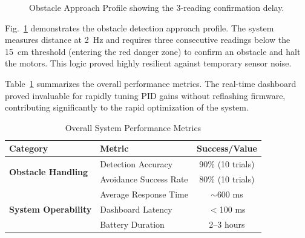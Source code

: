 \documentclass[conference]{IEEEtran}
\begin{document}
\begin{figure}[ht]
\centering
{}
\caption{Obstacle Approach Profile showing the 3-reading confirmation delay.}
\label{fig:obstacle}
\end{figure}

Fig.~\ref{fig:obstacle} demonstrates the obstacle detection approach profile. The system measures distance at 2~Hz and requires three consecutive readings below the 15~cm threshold (entering the red danger zone) to confirm an obstacle and halt the motors. This logic proved highly resilient against temporary sensor noise.

Table~\ref{tab:overall} summarizes the overall performance metrics. The real-time dashboard proved invaluable for rapidly tuning PID gains without reflashing firmware, contributing significantly to the rapid optimization of the system.

\begin{table}[ht]
\caption{Overall System Performance Metrics}
\label{tab:overall}
\centering
\begin{tabular}{llc}
\toprule
\textbf{Category} & \textbf{Metric} & \textbf{Success/Value} \\ \midrule
\multirow{2}{*}{\textbf{Obstacle Handling}} 
& Detection Accuracy & 90\% (10 trials) \\
& Avoidance Success Rate & 80\% (10 trials) \\ \midrule
\multirow{3}{*}{\textbf{System Operability}} 
& Average Response Time & $\sim$600 ms \\
& Dashboard Latency & $<$100 ms \\
& Battery Duration & 2--3 hours \\ \bottomrule
\end{tabular}
\end{table}
\end{document}

